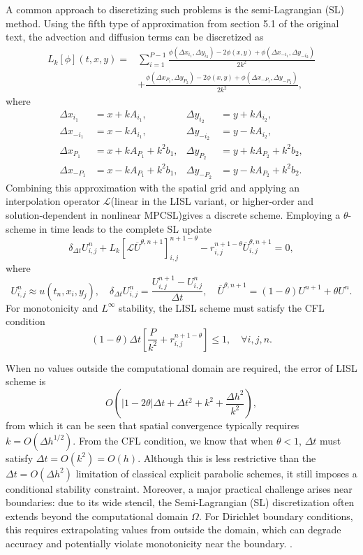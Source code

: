 \documentclass[11pt]{article}
\theoremstyle{mythm}
\theoremstyle{definition}
\begin{document}
	A common approach to discretizing such problems is the semi-Lagrangian (SL) method{\cite{bib4}}. Using the fifth type of approximation from section 5.1 of the original text, the advection and diffusion terms can be discretized as
	\begin{equation}
		\begin{aligned}
			L_k[\phi](t, x, y) =& \sum_{i=1}^{P-1} \frac{\phi(\Delta x_{i_1}, \Delta y_{i_2}) - 2\phi(x, y) + \phi(\Delta x_{-i_1}, \Delta y_{-i_2})}{2k^2}\\
			& + \frac{\phi(\Delta x_{P_1}, \Delta y_{P_2}) - 2\phi(x, y) + \phi(\Delta x_{-P_1}, \Delta y_{-P_2})}{2k^2},
		\end{aligned}
	\end{equation}
	where
	\[
	\begin{aligned}
		\Delta x_{i_1} &= x + k A_{i_1}, & \Delta y_{i_2} &= y + k A_{i_2},\\
		\Delta x_{-i_1} &= x - k A_{i_1}, & \Delta y_{-i_2} &= y - k A_{i_2},\\
		\Delta x_{P_1} &= x + k A_{P_1} + k^2 b_1, & \Delta y_{P_2} &= y + k A_{P_2} + k^2 b_2,\\
		\Delta x_{-P_1} &= x - k A_{P_1} + k^2 b_1, & \Delta y_{-P_2} &= y - k A_{P_2} + k^2 b_2.
	\end{aligned}
	\]
	Combining this approximation with the spatial grid and applying an interpolation operator \(\mathcal{L}\)(linear in the LISL variant, or higher‑order and solution‑dependent in nonlinear MPCSL)gives a discrete scheme. Employing a \(\theta\)-scheme in time leads to the complete SL update
	\begin{equation}
		\delta_{\Delta t} U_{i,j}^n + L_k[\mathcal{L} \overline{U}^{\theta,n+1}]_{i,j}^{n+1-\theta} - r_{i,j}^{n+1-\theta} \overline{U}_{i,j}^{\theta,n+1}=0,
	\end{equation}
	where
	\[
	U_{i,j}^n \approx u(t_n, x_i, y_j),\quad \delta_{\Delta t} U_{i,j}^n = \frac{U_{i,j}^{n+1} - U_{i,j}^{n}}{\Delta t},\quad \overline{U}^{\theta,n+1} = (1-\theta)U^{n+1} + \theta U^n.
	\]
	For monotonicity and $L^\infty$ stability, the  LISL scheme  must satisfy the CFL condition
	\[
	(1 - \theta) \Delta t \left[ \frac{P}{k^2} + r_{i,j}^{n+1-\theta} \right] \leq 1, \quad \forall i,j,n.
	\]
	
	When no values outside the computational domain are required, the error of LISL scheme is
	\[
	O\left( |1 - 2\theta|\Delta t + \Delta t^2 + k^2 + \frac{\Delta h^2}{k^2} \right),
	\]
	from which it can  be seen that spatial convergence typically requires \( k = O(\Delta h^{1/2}) \). From the CFL condition, we know that when \( \theta < 1 \), \( \Delta t \) must satisfy \( \Delta t = O(k^2) = O(h) \). Although this is less restrictive than the \( \Delta t = O(\Delta h^2) \) limitation of classical explicit parabolic schemes, it still imposes a conditional stability constraint.
	Moreover, a major practical challenge arises near boundaries: due to its wide stencil, the Semi-Lagrangian (SL) discretization often extends beyond the computational domain \( \Omega \). For Dirichlet boundary conditions, this requires extrapolating values from outside the domain, which can degrade accuracy and potentially violate monotonicity near the boundary.
	.
	
\end{document}
